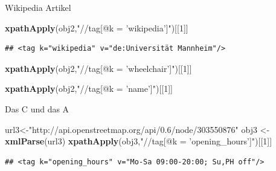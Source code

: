 \documentclass[ignorenonframetext,]{beamer}
\newenvironment{Shaded}{\begin{snugshade}}{\end{snugshade}}
\newcommand{\KeywordTok}[1]{\textcolor[rgb]{0.13,0.29,0.53}{\textbf{#1}}}
\newcommand{\DecValTok}[1]{\textcolor[rgb]{0.00,0.00,0.81}{#1}}
\newcommand{\StringTok}[1]{\textcolor[rgb]{0.31,0.60,0.02}{#1}}
\newcommand{\NormalTok}[1]{#1}
\begin{document}
\begin{frame}[fragile]{Wikipedia Artikel}

\begin{Shaded}
\begin{Highlighting}[]
\KeywordTok{xpathApply}\NormalTok{(obj2,}\StringTok{"//tag[@k = 'wikipedia']"}\NormalTok{)[[}\DecValTok{1}\NormalTok{]]}
\end{Highlighting}
\end{Shaded}

\begin{verbatim}
## <tag k="wikipedia" v="de:Universität Mannheim"/>
\end{verbatim}

\begin{Shaded}
\begin{Highlighting}[]
\KeywordTok{xpathApply}\NormalTok{(obj2,}\StringTok{"//tag[@k = 'wheelchair']"}\NormalTok{)[[}\DecValTok{1}\NormalTok{]]}
\end{Highlighting}
\end{Shaded}

\begin{Shaded}
\begin{Highlighting}[]
\KeywordTok{xpathApply}\NormalTok{(obj2,}\StringTok{"//tag[@k = 'name']"}\NormalTok{)[[}\DecValTok{1}\NormalTok{]]}
\end{Highlighting}
\end{Shaded}

\end{frame}

\begin{frame}[fragile]{Das C und das A}

\begin{Shaded}
\begin{Highlighting}[]
\NormalTok{url3<-}\StringTok{"http://api.openstreetmap.org/api/0.6/node/303550876"}
\NormalTok{obj3 <-}\StringTok{ }\KeywordTok{xmlParse}\NormalTok{(url3)}
\KeywordTok{xpathApply}\NormalTok{(obj3,}\StringTok{"//tag[@k = 'opening_hours']"}\NormalTok{)[[}\DecValTok{1}\NormalTok{]]}
\end{Highlighting}
\end{Shaded}

\begin{verbatim}
## <tag k="opening_hours" v="Mo-Sa 09:00-20:00; Su,PH off"/>
\end{verbatim}

\end{frame}
\end{document}
